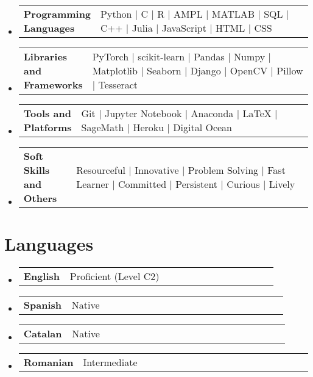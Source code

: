 \documentclass[a4paper,10pt]{article}
\makeatletter
\newcommand{\resumeSectionTypeOne}[2]{
  \item\begin{tabular*}{0.99\textwidth}[t]{
    p{0.18\linewidth}p{0.81\linewidth}
  }
  \textbf{#1} & #2
  \end{tabular*}\vspace{-2pt}
}
\newcommand{\resumeTrioHeading}[3]{
  \item
    \begin{tabular*}{0.96\textwidth}[t]{
      l@{\extracolsep{\fill}}c@{\extracolsep{\fill}}r
    }
      \textbf{#1} & \small \textit{#2} & \small #3
    \end{tabular*}
}
\newcommand{\resumeHeadingListStart}{
  \begin{itemize}[leftmargin=0.15in, label={}]
}
\newcommand{\resumeHeadingListEnd}{\end{itemize}}
\makeatother
\begin{document}
  \resumeHeadingListStart{}
    \resumeSectionTypeOne{Programming Languages}{Python \; $|$ \; C \; $|$ \; R \; $|$ \; AMPL \; $|$ \; MATLAB \; $|$ \; SQL \; $|$ \; C++ \; $|$ Julia \; $|$ JavaScript \; $|$ \; HTML \; $|$ \; CSS}
  \resumeHeadingListEnd{}

  \resumeHeadingListStart{}
    \resumeSectionTypeOne{Libraries and Frameworks}{PyTorch \; $|$ \; scikit-learn \; $|$ \; Pandas \; $|$ \; Numpy \; $|$ \; Matplotlib \; $|$ \; Seaborn \; $|$ \; Django \; $|$ \; OpenCV \; $|$ \; Pillow \; $|$ \; Tesseract}
  \resumeHeadingListEnd{}
  
  \resumeHeadingListStart{}
    \resumeSectionTypeOne{Tools and Platforms}{Git \; $|$ \; Jupyter Notebook \; $|$ \; Anaconda \; $|$ \; \LaTeX \; $|$ \; SageMath \; $|$ \; Heroku \; $|$ \; Digital Ocean}
  \resumeHeadingListEnd{}

  \resumeHeadingListStart{}
    \resumeSectionTypeOne{Soft Skills and Others}{Resourceful \; $|$ \; Innovative \; $|$ \; Problem Solving \; $|$ \; Fast Learner \; $|$ \; Committed \; $|$ \; Persistent \; $|$ \; Curious \; $|$ \; Lively }
  \resumeHeadingListEnd{}

\section{Languages}
  \resumeHeadingListStart{}
    \resumeSectionTypeOne{English}{Proficient (Level C2)}
    \resumeSectionTypeOne{Spanish}{Native}
    \resumeSectionTypeOne{Catalan}{Native}
    \resumeSectionTypeOne{Romanian}{Intermediate}
  \resumeHeadingListEnd{}


\end{document}
